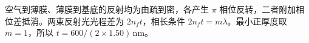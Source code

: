 空气到薄膜、薄膜到基底的反射均为由疏到密，各产生 $\pi$ 相位反转，二者附加相位差抵消。两束反射光光程差为 $2n_ft$，相长条件 $2n_ft=m\lambda$。最小正厚度取 $m=1$，所以 $t=600/(2\times1.50)\,\mathrm{nm}$。
